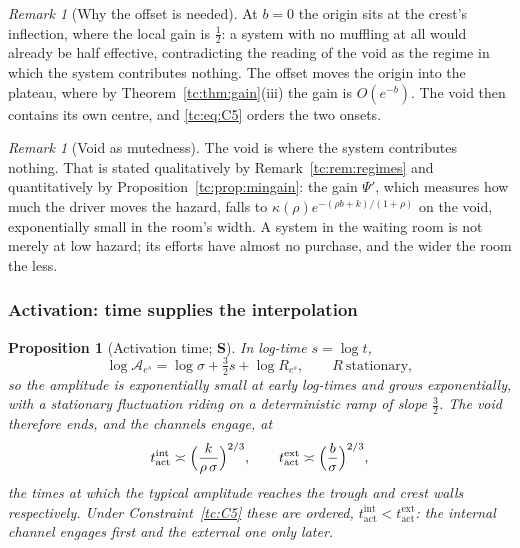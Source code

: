 \documentclass[11pt]{article}
\numberwithin{equation}{section}
\theoremstyle{plain}
\newtheorem{proposition}[theorem]{Proposition}
\theoremstyle{definition}
\theoremstyle{remark}
\newtheorem{remark}[theorem]{Remark}
\newcommand{\Ac}{\mathcal{A}}
\begin{document}
\begin{remark}[Why the offset is needed]\label{tc:rem:whyoffset}
At $b=0$ the origin sits at the crest's inflection, where the local gain
is $\tfrac12$: a system with no muffling at all would already be half
effective, contradicting the reading of the void as the regime in which
the system contributes nothing. The offset moves the origin into the
plateau, where by Theorem~\ref{tc:thm:gain}(iii) the gain is $O(e^{-b})$.
The void then contains its own centre, and \eqref{tc:eq:C5} orders the
two onsets.
\end{remark}

\begin{remark}[Void as mutedness]\label{tc:rem:mutedness}
The void is where the system contributes nothing. That is stated
qualitatively by Remark~\ref{tc:rem:regimes} and quantitatively by
Proposition~\ref{tc:prop:mingain}: the gain $\Psi'$, which measures how
much the driver moves the hazard, falls to
$\kappa(\rho)e^{-(\rho b+k)/(1+\rho)}$ on the void, exponentially small
in the room's width. A system in the waiting room is not merely at low hazard;
its efforts have almost no purchase, and the wider the room the less.
\end{remark}

\subsubsection{Activation: time supplies the interpolation}
\label{tc:subsub:activation}

\begin{proposition}[Activation time; \textbf{S}]\label{tc:prop:tact}
In log-time $s=\log t$,
\begin{equation}\label{tc:eq:logamp}
\log\Ac_{e^{s}}=\log\sigma+\tfrac32s+\log R_{e^{s}},
\qquad R\ \text{stationary},
\end{equation}
so the amplitude is exponentially small at early log-times and grows
exponentially, with a stationary fluctuation riding on a deterministic
ramp of slope $\tfrac32$. The void therefore ends, and the channels
engage, at
\begin{equation}\label{tc:eq:tact}
t^{\mathrm{int}}_{\mathrm{act}}\asymp\Bigl(\frac{k}{\rho\,\sigma}
\Bigr)^{2/3},
\qquad
t^{\mathrm{ext}}_{\mathrm{act}}\asymp\Bigl(\frac{b}{\sigma}\Bigr)^{2/3},
\end{equation}
the times at which the typical amplitude reaches the trough and crest
walls respectively. Under Constraint~\ref{tc:C5} these are ordered,
$t^{\mathrm{int}}_{\mathrm{act}}<t^{\mathrm{ext}}_{\mathrm{act}}$: the
internal channel engages first and the external one only later.
\end{proposition}
\end{document}

